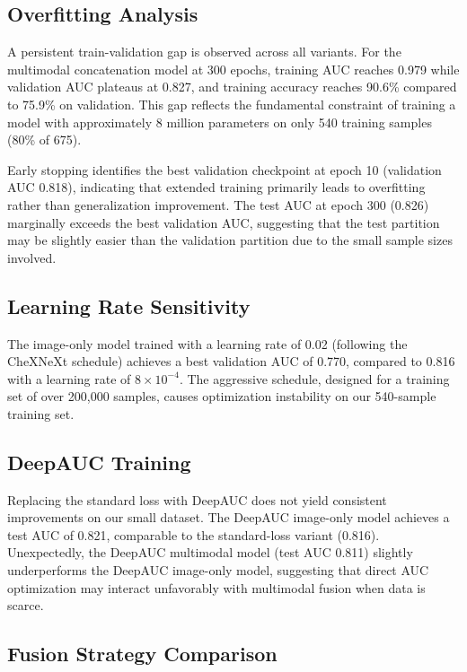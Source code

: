 \documentclass[conference]{IEEEtran}
\begin{document}
\subsection{Overfitting Analysis}

A persistent train-validation gap is observed across all variants. For the multimodal concatenation model at 300 epochs, training AUC reaches 0.979 while validation AUC plateaus at 0.827, and training accuracy reaches 90.6\% compared to 75.9\% on validation. This gap reflects the fundamental constraint of training a model with approximately 8 million parameters on only 540 training samples (80\% of 675).

Early stopping identifies the best validation checkpoint at epoch 10 (validation AUC 0.818), indicating that extended training primarily leads to overfitting rather than generalization improvement. The test AUC at epoch 300 (0.826) marginally exceeds the best validation AUC, suggesting that the test partition may be slightly easier than the validation partition due to the small sample sizes involved.

\subsection{Learning Rate Sensitivity}

The image-only model trained with a learning rate of 0.02 (following the CheXNeXt schedule) achieves a best validation AUC of 0.770, compared to 0.816 with a learning rate of $8 \times 10^{-4}$. The aggressive schedule, designed for a training set of over 200,000 samples, causes optimization instability on our 540-sample training set.

\subsection{DeepAUC Training}

Replacing the standard loss with DeepAUC does not yield consistent improvements on our small dataset. The DeepAUC image-only model achieves a test AUC of 0.821, comparable to the standard-loss variant (0.816). Unexpectedly, the DeepAUC multimodal model (test AUC 0.811) slightly underperforms the DeepAUC image-only model, suggesting that direct AUC optimization may interact unfavorably with multimodal fusion when data is scarce.

\subsection{Fusion Strategy Comparison}
\end{document}
